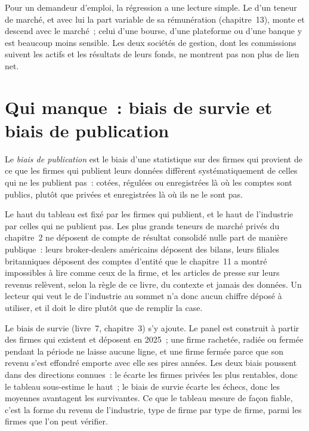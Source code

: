 Pour un demandeur d'emploi, la régression a une lecture simple. Le  d'un teneur de marché, et avec lui la part variable
de sa rémunération (chapitre~13), monte et descend avec le marché~; celui d'une bourse, d'une plateforme ou d'une banque y est beaucoup moins sensible.
Les deux sociétés de gestion, dont les commissions suivent les actifs et les résultats de leurs fonds, ne montrent pas non plus de lien net.

\section{Qui manque~: biais de survie et biais de publication}

\begin{definition}\label{def:in:revenue-and-profit-across-the-industry:disclosure}
Le \emph{biais de publication} est le biais d'une statistique sur des firmes qui provient de ce que les firmes qui
publient leurs données diffèrent systématiquement de celles qui ne les publient pas~: cotées, régulées ou enregistrées là où les comptes sont
publics, plutôt que privées et enregistrées là où ils ne le sont pas.
\end{definition}

Le haut du tableau est fixé par les firmes qui publient, et le haut de l'industrie par celles qui ne publient pas. Les plus grands
teneurs de marché privés du chapitre~2 ne déposent de compte de résultat consolidé nulle part de manière publique~: leurs broker-dealers américains déposent
des bilans, leurs filiales britanniques déposent des comptes d'entité que le chapitre~11 a montré impossibles à lire comme ceux de la firme, et
les articles de presse sur leurs revenus relèvent, selon la règle de ce livre, du contexte et jamais des données. Un lecteur qui veut le
 de l'industrie au sommet n'a donc aucun chiffre déposé à utiliser, et il doit le dire plutôt que de remplir la case.

Le biais de survie (livre~7, chapitre~3) s'y ajoute. Le panel est construit à partir des firmes qui existent et déposent en 2025~; une firme
rachetée, radiée ou fermée pendant la période ne laisse aucune ligne, et une firme fermée parce que son revenu s'est effondré emporte
avec elle ses pires années. Les deux biais poussent dans des directions connues~: le  écarte les firmes privées les plus rentables,
donc le tableau sous-estime le haut~; le biais de survie écarte les échecs, donc les moyennes avantagent les survivantes. Ce que le
tableau mesure de façon fiable, c'est la forme du revenu de l'industrie, type de firme par type de firme, parmi les firmes que l'on peut vérifier.


